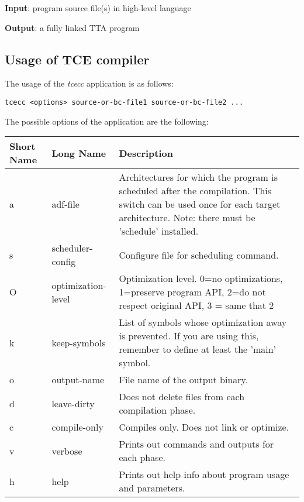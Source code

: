 \documentclass[twoside]{tceusermanual}
\begin{document}
\textbf{Input}: program source file(s) in high-level language

\textbf{Output}: a fully linked TTA program

\subsection{Usage of TCE compiler}

The usage of the \emph{tcecc} application is as follows:

\begin{verbatim}
tcecc <options> source-or-bc-file1 source-or-bc-file2 ...
\end{verbatim}

The possible options of the application are the following:\\
\begin{longtable}[htb]{@{}p{}@{}p{}%
                     @{}p{}}
\textbf{Short Name} &\textbf{Long Name} &\textbf{Description} \\
\hline
a & adf-file & Architectures for which the program is scheduled after the 
                        compilation. This switch can be used once for each 
                        target architecture. Note: there must be 'schedule'
                        installed.\\
s & scheduler-config & Configure file for scheduling command. \\
O & optimization-level & Optimization level. 0=no optimizations, 1=preserve
                       program API, 2=do not respect original API, 3 = same
                       that 2 \\
k & keep-symbols & List of symbols whose optimization away is prevented.
                   If you are using this, remember to define at least the
                   'main' symbol. \\
o & output-name & File name of the output binary. \\
d & leave-dirty & Does not delete files from each compilation phase. \\
c & compile-only & Compiles only. Does not link or optimize. \\
v & verbose & Prints out commands and outputs for each phase. \\
h & help & Prints out help info about program usage and parameters.\\

\end{longtable}
\end{document}
